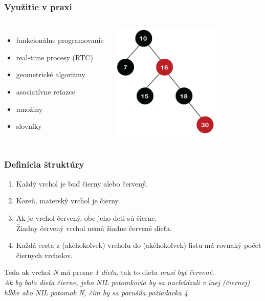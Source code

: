 \documentclass{beamer}
\begin{document}
    \begin{frame}
        \frametitle{Využitie v praxi}
        \begin{columns}
            \begin{itemize}
                \item funkcionálne programovanie
                \item real-time procesy (RTC)
                \item geometrické algoritmy
                \vspace{20pt}
                \item asociatívne reťazce
                \item množiny
                \item slovníky
            \end{itemize}
            \includegraphics[width=150pt]{rbt17}
        \end{columns}
    \end{frame}

    \begin{frame}
        \frametitle{Definícia štruktúry}
        \begin{enumerate}
            \item Každý vrchol je buď čierny alebo červený.
            \item Koreň, materský vrchol je čierny.
            \item Ak je vrchol červený, obe jeho deti sú čierne.\\
            Žiadny červený vrchol nemá žiadne červené dieťa.
            \item Každá cesta z (akéhokoľvek) vrcholu do (akéhokoľvek) listu má rovnaký počet čiernych vrcholov.
        \end{enumerate}
        \vspace{20pt}
        Teda ak vrchol \emph{N} má presne \emph{1 dieťa}, tak to dieťa \emph{musí byť červené}. \\
        \vspace{5pt}
        {\footnotesize{\emph{Ak by bolo dieťa čierne, jeho NIL potomkovia by sa nachádzali v inej (čiernej) hĺbke ako NIL potomok N, čím by sa porušila požiadavka 4.}}}

        \vspace{15pt}
    \end{frame}
\end{document}
